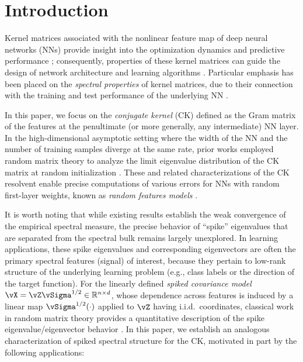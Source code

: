 \section{Introduction}

Kernel matrices associated with the nonlinear feature map
of deep neural networks (NNs) provide insight into the optimization dynamics \citep{jacot2018neural,montanari2020interpolation,fort2020deep} and predictive performance \citep{lee2017deep,arora2019fine,ortiz2021can}; consequently, properties of these kernel matrices can guide the design of network architecture 
\citep{xiao2018dynamical,martens2021rapid,li2022neural} and learning algorithms
\citep{karakida2020understanding,zhou2022dataset}. Particular
emphasis has been placed on the \textit{spectral properties} of kernel matrices, due to their connection with the training and test performance of the underlying NN \citep{bordelon2020spectrum,loureiro2021learning,wei2022more}. 

In this paper, we focus on the \textit{conjugate kernel} (CK)
\citep{neal1995bayesian,cho2009kernel} defined as the Gram matrix of the
features at the penultimate (or more generally, any intermediate) NN layer.
In the high-dimensional asymptotic setting where the width of the NN and the
number of training samples diverge at the same rate, prior works 
employed random matrix theory to analyze the limit eigenvalue distribution of
the CK matrix at random initialization
\citep{pennington2017nonlinear,louart2018random,peche2019note,fan2020spectra}.
These and related characterizations of the CK resolvent enable precise
computations of various errors for NNs with random first-layer
weights, known as \textit{random features models} 
\citep{mei2019generalization,tripuraneni2021covariate,hassani2022curse}. 

It is worth noting that while existing results establish the weak convergence of
the empirical spectral measure, the precise behavior of ``spike'' eigenvalues
that are separated from the spectral bulk remains largely unexplored.
In learning applications, these spike eigenvalues and corresponding eigenvectors
are often the primary spectral features (signal) of interest, because they pertain to
low-rank structure of the underlying learning problem (e.g., class labels or
the direction of the target function). For the linearly defined \textit{spiked
covariance model} $\vX=\vZ\vSigma^{1/2} \in \R^{n \times d}$,
whose dependence across features is induced by a
linear map $\vSigma^{1/2}(\cdot)$ applied to $\vZ$ having i.i.d.\ coordinates,
classical work in random matrix theory provides a quantitative description of
the spike eigenvalue/eigenvector behavior
\citep{johnstone2001distribution,baik2006eigenvalues,benaych2012singular,bloemendal2016principal}.
In this paper, we establish an analogous characterization of spiked spectral
structure for the CK, motivated in part by the following applications: 

